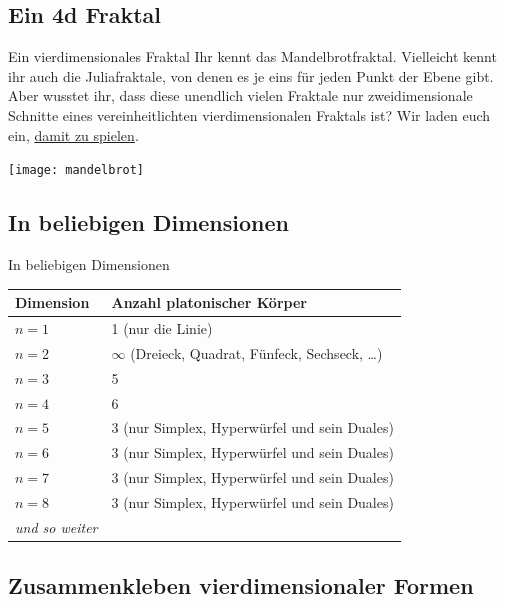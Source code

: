 \documentclass[12pt,compress,ngerman,utf8,t]{beamer}
\begin{document}


\subsection{Ein 4d Fraktal}

\begin{frame}{Ein vierdimensionales Fraktal}
  \justifying
  Ihr kennt das Mandelbrotfraktal.
  Vielleicht kennt ihr auch die Juliafraktale, von denen es je eins für jeden
  Punkt der Ebene gibt.
  Aber wusstet ihr, dass diese unendlich vielen Fraktale nur zweidimensionale
  Schnitte eines vereinheitlichten vierdimensionalen Fraktals ist?
  Wir laden euch ein,
  \href{https://rawgit.com/MatthiasHu/FractalsWebGL/4d/page.html}{damit zu spielen}.
  \bigskip

  \centering
  \texttt{[image: mandelbrot]}
  \par
\end{frame}


\subsection{In beliebigen Dimensionen}

\begin{frame}{In beliebigen Dimensionen}
  \centering
  \begin{tabular}{ll}
    \toprule
    Dimension & Anzahl platonischer Körper \\ \midrule
    $n = 1$ & 1 (nur die Linie) \\
    $n = 2$ & $\infty$ (Dreieck, Quadrat, Fünfeck, Sechseck, \ldots) \\
    $n = 3$ & 5 \\
    $n = 4$ & 6 \\
    $n = 5$ & 3 (nur Simplex, Hyperwürfel und sein Duales) \\
    $n = 6$ & 3 (nur Simplex, Hyperwürfel und sein Duales) \\
    $n = 7$ & 3 (nur Simplex, Hyperwürfel und sein Duales) \\
    $n = 8$ & 3 (nur Simplex, Hyperwürfel und sein Duales) \\
    \emph{und so weiter} \\
    \bottomrule
  \end{tabular}
  \par
\end{frame}


\subsection[Verkleben]{Zusammenkleben vierdimensionaler Formen}
\end{document}
